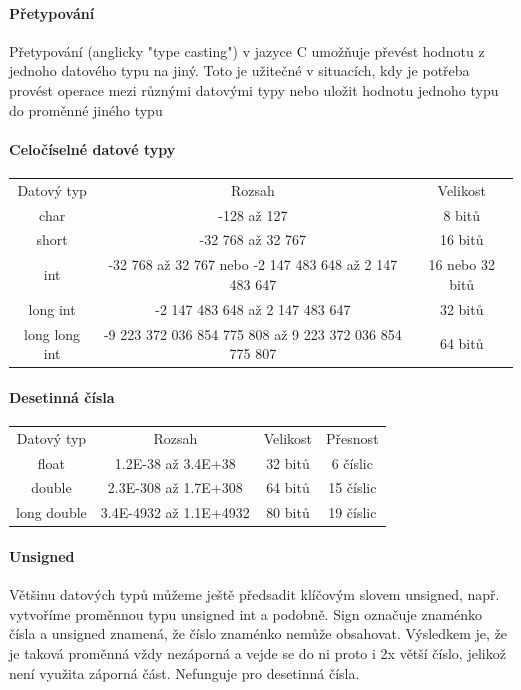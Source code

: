\paragraph{Přetypování}
Přetypování (anglicky "type casting") v jazyce C umožňuje převést hodnotu z jednoho datového typu na jiný. Toto je užitečné v situacích, kdy je potřeba provést operace mezi různými datovými typy nebo uložit hodnotu jednoho typu do proměnné jiného typu
\paragraph{Celočíselné datové typy}
\begin{center}
\begin{tabular}{ |c|c|c| } 
 \hline
 Datový typ & Rozsah & Velikost \\ 
 char & -128 až 127 & 8 bitů \\ 
 short & -32 768 až 32 767 & 16 bitů\\ 
 int & -32 768 až 32 767 nebo -2 147 483 648 až 2 147 483 647 & 16 nebo 32 bitů\\ 
 long int & -2 147 483 648 až 2 147 483 647 & 32 bitů\\ 
 long long int & -9 223 372 036 854 775 808 až 9 223 372 036 854 775 807 & 64 bitů\\ 
 \hline
\end{tabular}
\end{center}
\paragraph{Desetinná čísla}
\begin{center}
\begin{tabular}{ |c|c|c|c| } 
 \hline
  Datový typ & Rozsah & Velikost & Přesnost \\ 
  float & 1.2E-38 až 3.4E+38 & 32 bitů & 6 číslic\\ 
  double & 2.3E-308 až 1.7E+308 & 64 bitů & 15 číslic\\ 
  long double & 3.4E-4932 až 1.1E+4932 & 80 bitů & 19 číslic\\ 
 \hline
\end{tabular}
\end{center}

\paragraph{Unsigned}
Většinu datových typů můžeme ještě předsadit klíčovým slovem
unsigned, např. vytvoříme proměnnou typu
unsigned int a podobně. Sign označuje znaménko čísla a unsigned znamená,
že číslo znaménko nemůže obsahovat. Výsledkem je, že je taková
proměnná vždy nezáporná a vejde se do ni proto i 2x větší číslo,
jelikož není využita záporná část. Nefunguje pro desetinná čísla.

